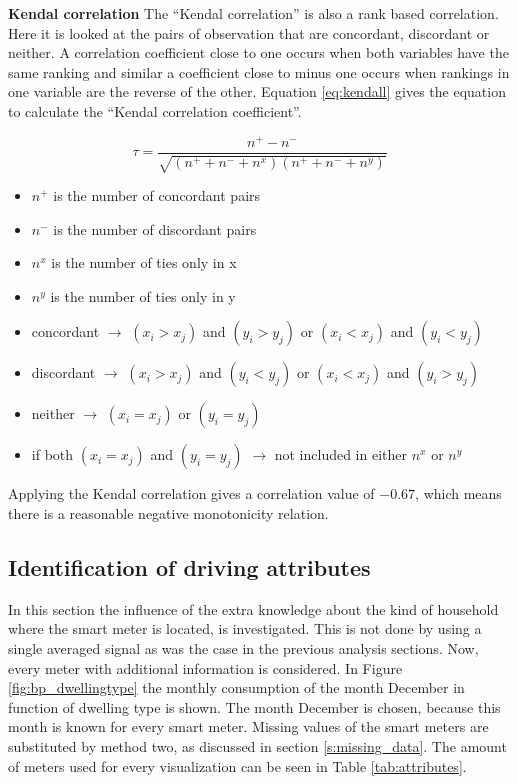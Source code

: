 \textbf{Kendal correlation}
The ``Kendal correlation'' is also a rank based correlation. Here it is looked at the pairs of observation that are concordant, discordant or neither. A correlation coefficient close to one occurs when both variables have the same ranking and similar a coefficient close to minus one occurs when rankings in one variable are the reverse of the other. Equation \ref{eq:kendall} gives the equation to calculate the ``Kendal correlation coefficient''.

\begin{equation}\label{eq:kendall}
	\tau = \frac{n^+-n^-}{\sqrt{(n^++n^-+n^x)(n^++n^-+n^y)}}
\end{equation}
\begin{itemize}
	\item $ n^+ $ is the number of concordant pairs
	\item $ n^- $ is the number of discordant pairs
	\item $ n^x $ is the number of ties only in x
	\item $ n^y $ is the number of ties only in y
	\item concordant $\rightarrow $ $ (x_i > x_j ) $ and $ (y_i > y_j ) $ or $ (x_i < x_j ) $ and $ (y_i < y_j ) $
	\item discordant $\rightarrow $ $ (x_i > x_j ) $ and $ (y_i < y_j ) $ or $ (x_i < x_j ) $ and $ (y_i > y_j ) $
	\item neither $\rightarrow $ $ (x_i = x_j ) $ or $ (y_i = y_j ) $
	\item if both $ (x_i = x_j ) $ and $ (y_i = y_j ) $ $\rightarrow $ not included in either $ n^x $ or $ n^y $
\end{itemize}

Applying the Kendal correlation  gives a correlation value of $ -0.67$, which means there is a reasonable negative monotonicity relation.\\




\subsection{Identification of driving attributes} \label{s:Identification of driving attributes}
In this section the influence of the extra knowledge about the kind of household where the smart meter is located, is investigated. This is not done by using a single averaged signal as was the case in the previous analysis sections. Now, every meter with additional information is considered. In Figure \ref{fig:bp_dwellingtype} the monthly consumption of the month December in function of dwelling type is shown. The month December is chosen, because this month is known for every smart meter. Missing values of the smart meters are substituted by method two, as discussed in section \ref{s:missing_data}. The amount of meters used for every visualization can be seen in Table \ref{tab:attributes}.


